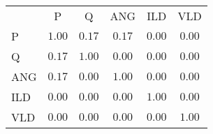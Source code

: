 \begin{tabular}{p{0.5cm}ccccc}
 & P & Q & ANG & ILD & VLD\\ 
P & 
 $1.00$
 & 
 $0.17$
 & 
 $0.17$
 & 
 $0.00$
 & 
 $0.00$
\\ 
Q & 
 $0.17$
 & 
 $1.00$
 & 
 $0.00$
 & 
 $0.00$
 & 
 $0.00$
\\ 
ANG & 
 $0.17$
 & 
 $0.00$
 & 
 $1.00$
 & 
 $0.00$
 & 
 $0.00$
\\ 
ILD & 
 $0.00$
 & 
 $0.00$
 & 
 $0.00$
 & 
 $1.00$
 & 
 $0.00$
\\ 
VLD & 
 $0.00$
 & 
 $0.00$
 & 
 $0.00$
 & 
 $0.00$
 & 
 $1.00$
\\ 
\end{tabular}
